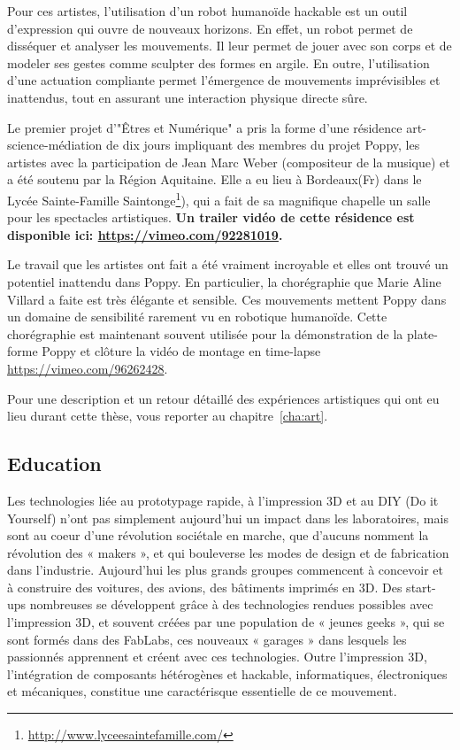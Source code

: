 Pour ces artistes, l'utilisation d'un robot humanoïde hackable est un outil d'expression qui ouvre de nouveaux horizons. En effet, un robot permet de disséquer et analyser les mouvements. Il leur permet de jouer avec son corps et de modeler ses gestes comme sculpter des formes en argile. En outre, l'utilisation d'une actuation compliante permet l'émergence de mouvements imprévisibles et inattendus, tout en assurant une interaction physique directe sûre.

Le premier projet d'"Êtres et Numérique" a pris la forme d'une résidence art-science-médiation de dix jours impliquant des membres du projet Poppy, les artistes avec la participation de Jean Marc Weber (compositeur de la musique) et a été soutenu par la Région Aquitaine. Elle a eu lieu à Bordeaux(Fr) dans le Lycée Sainte-Famille Saintonge\footnote{\url{http://www.lyceesaintefamille.com/}}), qui a fait de sa magnifique chapelle un salle pour les spectacles artistiques. \textbf{Un trailer vidéo de cette résidence est disponible ici: \url{https://vimeo.com/92281019}.}


Le travail que les artistes ont fait a été vraiment incroyable et elles ont trouvé un potentiel inattendu dans Poppy. En particulier, la chorégraphie que Marie Aline Villard a faite est très élégante et sensible. Ces mouvements mettent Poppy dans un domaine de sensibilité rarement vu en robotique humanoïde. Cette chorégraphie est maintenant souvent utilisée pour la démonstration de la plate-forme Poppy et clôture la vidéo de montage en time-lapse \url{https://vimeo.com/96262428}.

Pour une description et un retour détaillé des expériences artistiques qui ont eu lieu durant cette thèse, vous reporter au chapitre~\ref{cha:art}.

\subsection*{Education} %
Les technologies liée au prototypage rapide, à l’impression 3D et au DIY (Do it Yourself) n’ont pas simplement aujourd’hui un impact dans les laboratoires, mais sont au coeur d’une révolution sociétale en marche, que d’aucuns nomment la révolution des « makers », et qui bouleverse les modes de design et de fabrication dans l’industrie. Aujourd’hui les plus grands groupes commencent à concevoir et à construire des voitures, des avions, des bâtiments imprimés en 3D. Des start-ups nombreuses se développent grâce à des technologies rendues possibles avec l’impression 3D, et souvent créées par une population de « jeunes geeks », qui se sont formés dans des FabLabs, ces nouveaux « garages » dans lesquels les passionnés apprennent et créent avec ces technologies. Outre l’impression 3D, l’intégration de composants hétérogènes et hackable, informatiques, électroniques et mécaniques, constitue une caractérisque essentielle de ce mouvement.

